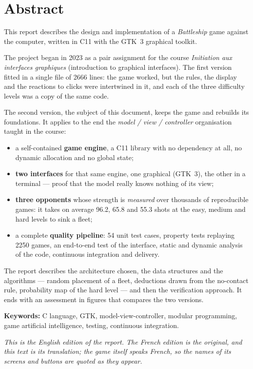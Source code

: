 \chapter*{Abstract}

This report describes the design and implementation of a \emph{Battleship} game against the
computer, written in C11 with the GTK~3 graphical toolkit.

The project began in 2023 as a pair assignment for the course \emph{Initiation aux interfaces
    graphiques} (introduction to graphical interfaces). The first version fitted in a single file
of \num{2666} lines: the game worked, but the rules, the display and the reactions to clicks
were intertwined in it, and each of the three difficulty levels was a copy of the same code.

The second version, the subject of this document, keeps the game and rebuilds its foundations.
It applies to the end the \emph{model / view / controller} organisation taught in the course:

\begin{itemize}
    \item a self-contained \textbf{game engine}, a C11 library with no dependency at all, no
          dynamic allocation and no global state;
    \item \textbf{two interfaces} for that same engine, one graphical (GTK~3), the other in a
          terminal --- proof that the model really knows nothing of its view;
    \item \textbf{three opponents} whose strength is \emph{measured} over thousands of
          reproducible games: it takes on average \num{96.2}, \num{65.8} and \num{55.3} shots
          at the easy, medium and hard levels to sink a fleet;
    \item a complete \textbf{quality pipeline}: 54 unit test cases, property tests replaying
          \num{2250} games, an end-to-end test of the interface, static and dynamic analysis
          of the code, continuous integration and delivery.
\end{itemize}

The report describes the architecture chosen, the data structures and the algorithms ---
random placement of a fleet, deductions drawn from the no-contact rule, probability map of the
hard level --- and then the verification approach. It ends with an assessment in figures that
compares the two versions.

\vspace{1.2em}
\noindent\textbf{Keywords:} C language, GTK, model-view-controller, modular programming, game
artificial intelligence, testing, continuous integration.

\vspace{1.2em}
\noindent\emph{This is the English edition of the report. The French edition is the original,
    and this text is its translation; the game itself speaks French, so the names of its screens
    and buttons are quoted as they appear.}
